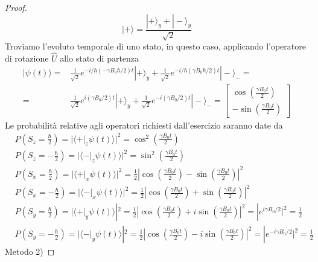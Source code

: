 \begin{proof}
\begin{equation*}
	|+ \rangle = \frac{|+ \rangle_y + | - \rangle_y}{\sqrt{2}}
\end{equation*}
Troviamo l'evoluto temporale di uno stato, in questo caso, applicando l'operatore di rotazione $\hat{U}$ allo stato di partenza
\begin{align*}
	|\psi(t) \rangle = &  \frac{1}{\sqrt{2}}e^{-i/\hbar (-\gamma B_0 \hbar/2 )t}|+\rangle_y + \frac{1}{\sqrt{2}} e^{- i / \hbar (\gamma B_0 \hbar / 2)t}|- \rangle_- = \\[0.3cm]
	= &  \frac{1}{\sqrt{2}}e^{i (\gamma B_0/2 )t}|+\rangle_y + \frac{1}{\sqrt{2}} e^{- i (\gamma B_0 / 2)t}|- \rangle_-  =  \left [\begin{array}{c}
		\cos(\frac{\gamma B_0t}{2}) \\[0.2cm]
		-\sin (\frac{\gamma B_0t}{2})
	\end{array}\right]
\end{align*}
Le probabilit\`a relative agli operatori richiesti dall'esercizio saranno date da 
\begin{align*}
	&P \left (S_z  = \frac{\hbar}{2} \right ) = | \langle + |_z  \psi(t) \rangle |^2 = \cos^2 \left (\frac{\gamma B_0 t}{2} \right ) \\[0.5cm]
	&P \left (S_z  = -\frac{\hbar}{2} \right ) = | \langle - |_z  \psi(t) \rangle |^2 = \sin^2 \left (\frac{\gamma B_0 t}{2} \right ) \\[0.5cm] 
	&P \left (S_x = \frac{\hbar}{2} \right ) = | \langle + |_x  \psi(t) \rangle |^2 =  \frac{1}{2} \left | \cos \left (\frac{\gamma B_0 t}{2} \right ) - \sin \left (\frac{\gamma B_0 t}{2} \right )  \right |^2 \\[0.5cm]
	&P \left (S_x = -\frac{\hbar}{2} \right ) = | \langle - |_x  \psi(t) \rangle |^2 =  \frac{1}{2} \left | \cos \left (\frac{\gamma B_0 t}{2} \right ) + \sin \left (\frac{\gamma B_0 t}{2} \right )  \right |^2 \\[0.5cm]
	&P \left (S_y = \frac{\hbar}{2} \right ) = | \langle + |_y  \psi(t) \rangle |^2 =  \frac{1}{2} \left | \cos \left (\frac{\gamma B_0 t}{2} \right ) + i \sin \left (\frac{\gamma B_0 t}{2} \right )  \right |^2 = |e^{i \gamma B_0/2}|^2 = \frac{1}{2} \\[0.5cm]
	&P \left (S_y = -\frac{\hbar}{2} \right ) = | \langle - |_y  \psi(t) \rangle |^2 =  \frac{1}{2} \left | \cos \left (\frac{\gamma B_0 t}{2} \right ) - i \sin \left (\frac{\gamma B_0 t}{2} \right )  \right |^2 = |e^{-i \gamma B_0/2}|^2 = \frac{1}{2} 
\end{align*}
Metodo 2) 

\end{proof}

